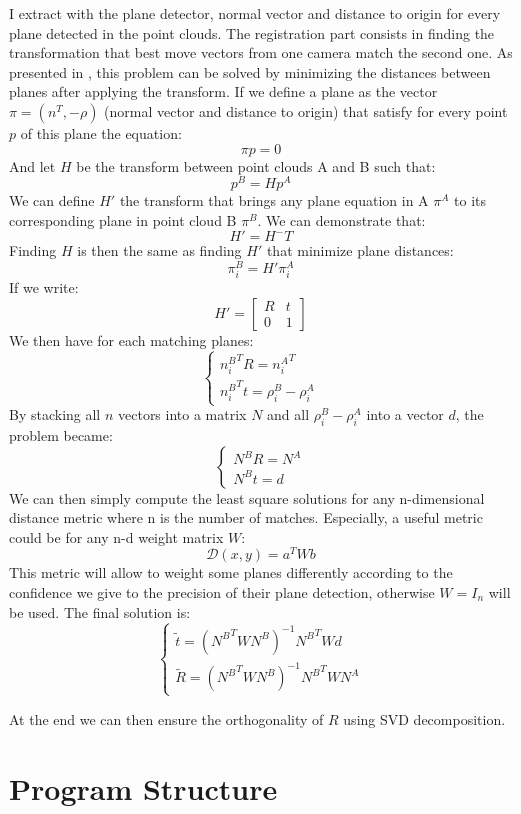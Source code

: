 I extract with the plane detector, normal vector and distance to origin for every plane detected in the point clouds. The registration part consists in finding the transformation that best move vectors from one camera match the second one. \newline
As presented in \cite{Khoshelham2016}, this problem can be solved by minimizing the distances between planes after applying the transform. \newline
If we define a plane as the vector $\pi=(n^T, -\rho)$ (normal vector and distance to origin) that satisfy for every point $p$ of this plane the equation:
\[\pi p=0\]
And let $H$ be the transform between point clouds A and B such that:
\[p^B = Hp^A\]
We can define $H'$ the transform that brings any plane equation in A $\pi^A$ to its corresponding plane in point cloud B $\pi^{B}$. We can demonstrate that: \[H'=H^-T\]
Finding $H$ is then the same as finding $H'$ that minimize plane distances: \[\pi^B_i=H'\pi^A_i\]
If we write:
\[H'=\begin{bmatrix}
R & t\\ 
0 & 1
\end{bmatrix}\]
We then have for each matching planes:
\[\left\{\begin{matrix}
{n_i^B}^TR={n_i^A}^T\\ 
{n_i^B}^Tt=\rho_i^B-\rho_i^A
\end{matrix}\right.\]
By stacking all $n$ vectors into a matrix $N$ and all $\rho_i^B-\rho_i^A$ into a vector $d$, the problem became:
\[\left\{\begin{matrix}
N^BR=N^A\\ 
N^Bt=d
\end{matrix}\right.\]
We can then simply compute the least square solutions for any n-dimensional distance metric where n is the number of matches. Especially, a useful metric could be for any n-d weight matrix $W$:
\[\mathcal{D}(x,y)=a^TWb\]
This metric will allow to weight some planes differently according to the confidence we give to the precision of their plane detection, otherwise $W=I_n$ will be used.
The final solution is:
\[\left\{\begin{matrix}
\tilde{t}=({N^B}^TWN^B)^{-1}{N^B}^TWd\\ 
\tilde{R}=({N^B}^TWN^B)^{-1}{N^B}^TWN^A
\end{matrix}\right.\]

At the end we can then ensure the orthogonality of $R$ using SVD decomposition.

\section{Program Structure}